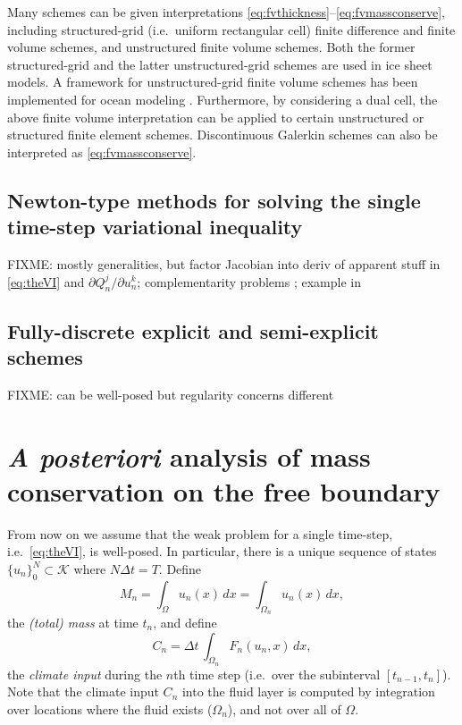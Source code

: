 \documentclass[final,leqno,onefignum,onetabnum]{siamltex1213bueler}
\begin{document}
Many schemes can be given interpretations \eqref{eq:fvthickness}--\eqref{eq:fvmassconserve}, including structured-grid (i.e.~uniform rectangular cell) finite difference \cite{MortonMayers2005} and finite volume \cite{LeVeque2002} schemes, and unstructured finite volume schemes.  Both the former structured-grid \cite{Winkelmannetal2011} and the latter unstructured-grid \cite{EgholmNielsen2010} schemes are used in ice sheet models.  A framework for unstructured-grid finite volume schemes has been implemented for ocean modeling \cite{Ringleretal2013}.  Furthermore, by considering a dual cell, the above finite volume interpretation can be applied to certain unstructured or structured finite element schemes.  Discontinuous Galerkin schemes can also be interpreted as \eqref{eq:fvmassconserve}.

\subsection{Newton-type methods for solving the single time-step variational inequality} \label{subsec:newtonvi}  FIXME: mostly generalities, but factor Jacobian into deriv of apparent stuff in \eqref{eq:theVI} and $\partial Q_n^j/\partial u_n^k$; complementarity problems \cite{BensonMunson2006,BillupsMurty2000}; example in \cite{Bueler2015}

\subsection{Fully-discrete explicit and semi-explicit schemes} \label{subsec:spaceexplicit}  FIXME:  can be well-posed but regularity concerns different


\section{\emph{A posteriori} analysis of mass conservation on the free boundary}  \label{sec:timeseries}

From now on we assume that the weak problem for a single time-step, i.e.~\eqref{eq:theVI}, is well-posed.  In particular, there is a unique sequence of states $\{u_n\}_0^N \subset \mathcal{K}$ where $N\Delta t = T$. Define
\begin{equation}
M_n = \int_\Omega u_n(x)\,dx = \int_{\Omega_n} u_n(x)\,dx, \label{eq:totalmassseries}
\end{equation}
the \emph{(total) mass} at time $t_n$, and define
\begin{equation}
C_n = \Delta t\, \int_{\Omega_n} F_n(u_n,x)\,dx, \label{eq:climateseries}
\end{equation}
the \emph{climate input} during the $n$th time step (i.e.~over the subinterval $[t_{n-1},t_n]$).  Note that the climate input $C_n$ into the fluid layer is computed by integration over locations where the fluid exists ($\Omega_n$), and not over all of $\Omega$.
\end{document}
